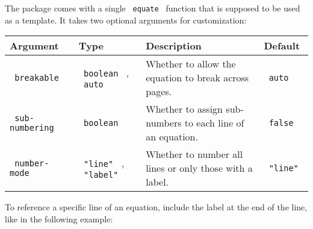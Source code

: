 The package comes with a single \texttt{\ equate\ } function that is
supposed to be used as a template. It takes two optional arguments for
customization:

\begin{longtable}[]{@{}llll@{}}
\toprule\noalign{}
Argument & Type & Description & Default \\
\midrule\noalign{}
\endhead
\bottomrule\noalign{}
\endlastfoot
\texttt{\ breakable\ } & \texttt{\ boolean\ } , \texttt{\ auto\ } &
Whether to allow the equation to break across pages. &
\texttt{\ auto\ } \\
\texttt{\ sub-numbering\ } & \texttt{\ boolean\ } & Whether to assign
sub-numbers to each line of an equation. & \texttt{\ false\ } \\
\texttt{\ number-mode\ } & \texttt{\ "line"\ } , \texttt{\ "label"\ } &
Whether to number all lines or only those with a label. &
\texttt{\ "line"\ } \\
\end{longtable}

To reference a specific line of an equation, include the label at the
end of the line, like in the following example:

\begin{Shaded}
\begin{Highlighting}[]



\NormalTok{$}

\end{Highlighting}
\end{Shaded}

\pandocbounded{}\\
\pandocbounded{}

